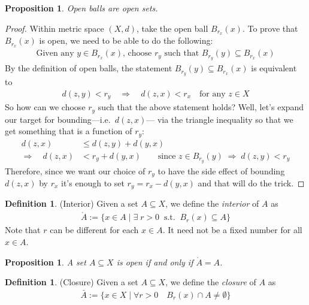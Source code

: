 \documentclass[12pt]{article}
\numberwithin{equation}{section} %
\theoremstyle{plain}
\newtheorem{prop}[thm]{Proposition}
\theoremstyle{definition}
\newtheorem{defn}[thm]{Definition}
\theoremstyle{remark}
\begin{document}
\begin{prop}
Open balls are open sets.
\end{prop}
\begin{proof}
Within metric space $(X,d)$, take the open ball $B_{r_x}(x)$.  To prove
that $B_{r_x}(x)$ is open, we need to be able to do the following:
\begin{align*}
  \text{Given any $y\in B_{r_x}(x)$, choose $r_y$ such that $B_{r_y}(y)\subseteq B_{r_x}(x)$}
\end{align*}
By the definition of open balls, the statement $B_{r_y}(y)\subseteq
B_{r_x}(x)$ is equivalent to
\begin{align*}
  d(z,y) < r_y \quad\Rightarrow\quad
  d(z,x) < r_x
  \quad\text{for any $z\in X$}
\end{align*}
So how can we choose $r_y$ such that the above statement holds?
Well, let's expand our target for bounding---i.e.\ $d(z,x)$--- via the
triangle inequality so that we get something that is a function of
$r_y$:
\begin{align*}
  d(z,x) &\leq d(z,y) + d(y,x)\\
  \Rightarrow \quad
  d(z,x) &< r_y + d(y,x) \qquad
  \text{since $z\in B_{r_y}(y) \; \Rightarrow\; d(z,y)<r_y$}
\end{align*}
Therefore, since we want our choice of $r_y$ to have the side effect of
bounding $d(z,x)$ by $r_x$ it's enough to set $r_y = r_x - d(y,x)$ and
that will do the trick.
\end{proof}

\begin{defn}{(Interior)}
Given a set $A\subseteq X$, we define the \emph{interior} of $A$ as
\begin{align*}
  \mathring{A}
  := \{x \in A \; | \; \exists\; r>0 \;\; \text{s.t.} \;\; B_r(x) \subseteq A\}
\end{align*}
Note that $r$ can be different for each $x\in A$. It need not be a fixed
number for all $x\in A$.
\end{defn}

\begin{prop}
A set $A\subseteq X$ is open if and only if $\mathring{A} = A$.
\end{prop}

\begin{defn}{(Closure)}
Given a set $A\subseteq X$, we define the \emph{closure} of $A$ as
\begin{align*}
  \bar{A}:= \{
    x\in X \;|\;
    \forall r>0 \quad B_r(x) \cap A \neq \emptyset
  \}
\end{align*}
\end{defn}
\end{document}
